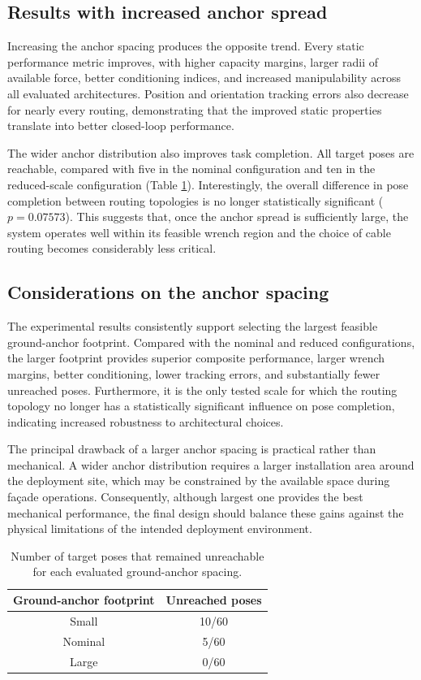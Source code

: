 \subsection{Results with increased anchor spread}

Increasing the anchor spacing produces the opposite trend. Every static performance metric improves, with higher capacity margins, larger radii of available force, better conditioning indices, and increased manipulability across all evaluated architectures. Position and orientation tracking errors also decrease for nearly every routing, demonstrating that the improved static properties translate into better closed-loop performance.

The wider anchor distribution also improves task completion. All target poses are reachable, compared with five in the nominal configuration and ten in the reduced-scale configuration (Table \ref{tab:reachposeSize}). Interestingly, the overall difference in pose completion between routing topologies is no longer statistically significant ($p=0.07573$). This suggests that, once the anchor spread is sufficiently large, the system operates well within its feasible wrench region and the choice of cable routing becomes considerably less critical.

\subsection{Considerations on the anchor spacing}
The experimental results consistently support selecting the largest feasible ground-anchor footprint. Compared with the nominal and reduced configurations, the larger footprint provides superior composite performance, larger wrench margins, better conditioning, lower tracking errors, and substantially fewer unreached poses. Furthermore, it is the only tested scale for which the routing topology no longer has a statistically significant influence on pose completion, indicating increased robustness to architectural choices.

The principal drawback of a larger anchor spacing is practical rather than mechanical. A wider anchor distribution requires a larger installation area around the deployment site, which may be constrained by the available space during façade operations. Consequently, although largest one provides the best mechanical performance, the final design should balance these gains against the physical limitations of the intended deployment environment.

\begin{table}[ht]
\centering
\begin{tabular}{cc}
\toprule
Ground-anchor footprint & Unreached poses \\
\midrule
Small  & 10/60 \\
Nominal & 5/60 \\
Large  & \phantom{0}0/60 \\
\bottomrule
\end{tabular}
\caption{Number of target poses that remained unreachable for each evaluated ground-anchor spacing.}
\label{tab:reachposeSize}
\end{table}

